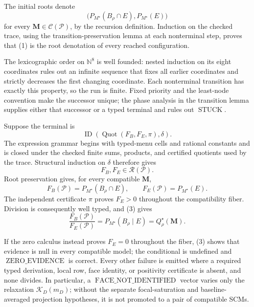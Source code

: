 The initial roots denote
\[
\bigl(P_{M^\star}(B_\rho\cap E),P_{M^\star}(E)\bigr)
\tag{1}
\]
for every \(\mathbf M\in\mathcal C(\mathcal P)\), by the recursion definition.  Induction on the checked trace, using the transition-preservation lemma at each nonterminal step, proves that (1) is the root denotation of every reached configuration.

The lexicographic order on \(\mathbb N^8\) is well founded: nested induction on its eight coordinates rules out an infinite sequence that fixes all earlier coordinates and strictly decreases the first changing coordinate.  Each nonterminal transition has exactly this property, so the run is finite.  Fixed priority and the least-node convention make the successor unique; the phase analysis in the transition lemma supplies either that successor or a typed terminal and rules out \(\operatorname{STUCK}\).

Suppose the terminal is
\[
\operatorname{ID}(\operatorname{Quot}(F_B,F_E,\pi),\delta).
\]
The expression grammar begins with typed-menu cells and rational constants and is closed under the checked finite sums, products, and certified quotients used by the trace.  Structural induction on \(\delta\) therefore gives
\[
F_B,F_E\in\mathscr R(\mathcal P).
\tag{2}
\]
Root preservation gives, for every compatible \(\mathbf M\),
\[
F_B(\mathcal P)=P_{M^\star}(B_\rho\cap E),
\qquad
F_E(\mathcal P)=P_{M^\star}(E).
\tag{3}
\]
The independent certificate \(\pi\) proves \(F_E>0\) throughout the compatibility fiber.  Division is consequently well typed, and (3) gives
\[
\frac{F_B(\mathcal P)}{F_E(\mathcal P)}
=P_{M^\star}(B_\rho\mid E)
=Q_\rho^\star(\mathbf M).
\]

If the zero calculus instead proves \(F_E=0\) throughout the fiber, (3) shows that evidence is null in every compatible model; the conditional is undefined and \(\operatorname{ZERO\_EVIDENCE}\) is correct.  Every other failure is emitted where a required typed derivation, local row, face identity, or positivity certificate is absent, and none divides.  In particular, a \(\operatorname{FACE\_NOT\_IDENTIFIED}\) vector varies only the relaxation \(\mathcal K_D(m_D)\); without the separate focal-saturation and baseline-averaged projection hypotheses, it is not promoted to a pair of compatible SCMs.